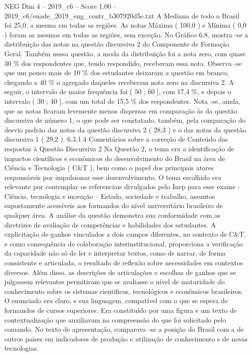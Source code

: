 \begin{textsample}{NEG Dim 4 – 2019\_c6 – Score 1.00 – 2019\_c6/enade\_2019\_eng\_contr\_b307920d5e.txt}
A Mediana de todo o Brasil foi 25,0, a mesma em todas as regiões.
As notas Máxima ( 100,0 ) e Mínima ( 0,0 ) foram as mesmas em todas as regiões, sem exceção.
No Gráfico 6.8, mostra -se a distribuição das notas na questão discursiva 2 do Componente de Formação Geral.
Também nessa questão, a moda da distribuição foi a nota zero, com quase 30 \% dos respondentes que, tendo respondido, receberam essa nota.
Observa -se que um pouco mais de 10 \% dos estudantes deixaram a questão em branco, chegando a 40 \% o agregado daqueles receberam nota zero na discursiva 2.
A seguir, o intervalo de maior frequência foi ( 50 ; 60 ], com 17,4 \%, e depois o intervalo ( 30 ; 40 ], com um total de 15,5 \% dos respondentes.
Nota -se, ainda, que as notas ficaram levemente menos dispersas em comparação às da questão discursiva de número 1, o que pode ser constatado, também, pela comparação do desvio padrão das notas da questão discursiva 2 ( 28,3 ) e o das notas da questão discursiva 1 ( 29,2 ). 6.3.1.4 Comentários sobre a correção de Conteúdo das respostas à Questão Discursiva 2 Na Questão 2, o tema era a identificação de impactos científicos e econômicos do desenvolvimento do Brasil na área de Ciência e Tecnologia ( C\&T ), bem como o papel dos principais atores responsáveis por impulsionar esse desenvolvimento.
O tema escolhido era relevante por contemplar os referenciais divulgados pelo Inep para esse exame : Ciência, tecnologia e inovação – Estado, sociedade e trabalho, assuntos supostamente acessíveis aos formandos do nível universitário brasileiro de qualquer área.
A análise da questão demonstra sua conformidade com as diretrizes de avaliação de competências e habilidades dos estudantes.
A explicitação de ganhos vinculados a dois campos diferentes, no contexto de C\&T, e como consequência de colaboração interinstitucional, proporciona a verificação da capacidade não só de ler e interpretar textos, como de narrar, de forma consistente e articulada, o resultado de reflexão sobre necessidades em contextos diversos.
Além disso, as descrições de articulações e escolhas de ganhos que se julgassem relevantes permitiram que se avaliasse o nível de maturidade do conhecimento sobre os sistemas científicos, tecnológicos e econômicos brasileiros.
O enunciado era claro, e sua linguagem, compatível com o que se espera de formandos de cursos superiores.
Era constituído por uma figura e um texto de contextualização que auxiliavam na compreensão do que foi solicitado pelo comando.
No texto de apresentação, comparava -se a posição do Brasil com a de outros países em indicadores de produção e utilização de conhecimento e de novas tecnologias.

\end{textsample}

